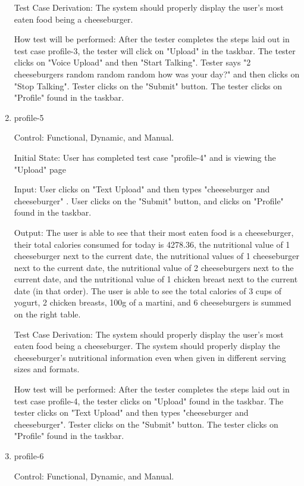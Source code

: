 \documentclass[12pt, titlepage]{article}
\begin{document}
\begin{enumerate}
		Test Case Derivation: The system should properly display the user's most eaten food being a cheeseburger.
		
		How test will be performed: After the tester completes the steps laid out in test case profile-3, the tester will click on "Upload" in the taskbar. The tester clicks on "Voice Upload" and then "Start Talking". Tester says "2 cheeseburgers random random random how was your day?" and then clicks on "Stop Talking". Tester clicks on the "Submit" button. The tester clicks on "Profile" found in the taskbar.
		
		\item{profile-5\\}
		
		Control: Functional, Dynamic, and Manual.
		
		Initial State: User has completed test case "profile-4" and is viewing the "Upload" page
		
		Input: User clicks on "Text Upload" and then types "cheeseburger and cheeseburger" . User clicks on the "Submit" button, and clicks on "Profile" found in the taskbar.
		
		Output: The user is able to see that their most eaten food is a cheeseburger, their total calories consumed for today is 4278.36, the nutritional value of 1 cheeseburger next to the current date, the nutritional values of 1 cheeseburger next to the current date, the nutritional value of 2 cheeseburgers next to the current date, and the nutritional value of 1 chicken breast next to the current date (in that order). The user is able to see the total calories of 3 cups of yogurt, 2 chicken breasts, 100g of a martini, and 6 cheeseburgers is summed on the right table.
		
		Test Case Derivation: The system should properly display the user's most eaten food being a cheeseburger. The system should properly display the cheeseburger's nutritional information even when given in different serving sizes and formats.
		
		How test will be performed: After the tester completes the steps laid out in test case profile-4, the tester clicks on "Upload" found in the taskbar. The tester clicks on "Text Upload" and then types "cheeseburger and cheeseburger". Tester clicks on the "Submit" button. The tester clicks on "Profile" found in the taskbar.
		
		\item{profile-6\\}
		
		Control: Functional, Dynamic, and Manual.
		

\end{enumerate}
\end{document}
